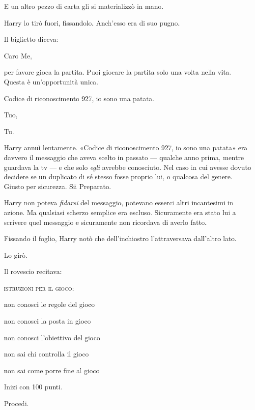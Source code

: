 E un altro pezzo di carta gli si materializzò in mano.

Harry lo tirò fuori, fissandolo. Anch’esso era di suo pugno.

Il biglietto diceva:

\vspace{1em}
\begin{addmargin}[3em]{3em}%
\begin{itpars}
Caro Me,

per favore gioca la partita. Puoi giocare la partita solo una volta nella vita. Questa è un’opportunità unica.

Codice di riconoscimento 927, io sono una patata.

Tuo,

Tu.
\end{itpars}
\end{addmargin}
\vspace{1em}

Harry annuì lentamente. «Codice di riconoscimento 927, io sono una patata» era davvero il messaggio che aveva scelto in passato — qualche anno prima, mentre guardava la tv — e che solo \textit{egli} avrebbe conosciuto. Nel caso in cui avesse dovuto decidere se un duplicato di sé stesso fosse proprio lui, o qualcosa del genere. Giusto per sicurezza. Sii Preparato.

Harry non poteva \textit{fidarsi} del messaggio, potevano esserci altri incantesimi in azione. Ma qualsiasi scherzo semplice era escluso. Sicuramente era stato lui a scrivere quel messaggio e sicuramente non ricordava di averlo fatto.

Fissando il foglio, Harry notò che dell’inchiostro l’attraversava dall’altro lato.

Lo girò.

Il rovescio recitava:

\vspace{1em}
\begin{addmargin}[3em]{3em}%
\begin{itpars}
\begin{center}
\textsc{istruzioni per il gioco:}

non conosci le regole del gioco

non conosci la posta in gioco

non conosci l’obiettivo del gioco

non sai chi controlla il gioco

non sai come porre fine al gioco

Inizi con 100 punti.

Procedi.
\end{center}
\end{itpars}
\end{addmargin}
\vspace{1em}

